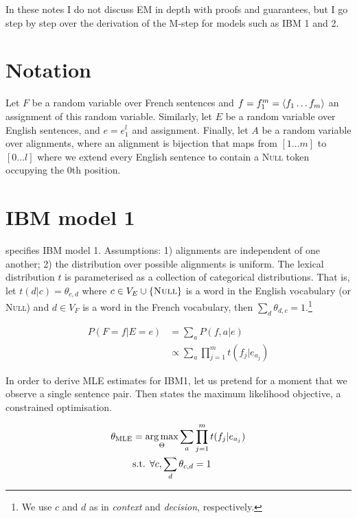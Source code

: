 In these notes I do not discuss EM in depth with proofs and guarantees, but I go step by step over the derivation of the M-step for models such as IBM 1 and 2.

\section{Notation}


Let $F$ be a random variable over French sentences and $f = f_1^m = \left\langle f_1 \ldots f_m \right\rangle$ an assignment of this random variable.
Similarly, let $E$ be a random variable over English sentences, and $e=e_1^l$ and assignment.
Finally, let $A$ be a random variable over alignments, where an alignment is bijection that maps from $[1 \ldots m]$ to $[0 \ldots l]$ where we extend every English sentence to contain a \textsc{Null} token occupying the $0$th position.


\section{IBM model 1}

 specifies IBM model 1\citep{Brown+1993:smt}.
Assumptions: 1) alignments are independent of one another; 2) the distribution over possible alignments is uniform.
The lexical distribution $t$ is parameterised as a collection of categorical distributions. That is, let $t(d|c) = \theta_{c,d}$ where $c \in V_E \cup \{\textsc{Null}\}$ is a word in the English vocabulary (or \textsc{Null}) and $d \in V_F$ is a word in the French vocabulary, then $\sum_d \theta_{d,c} = 1$.\footnote{We use $c$ and $d$ as in \emph{context} and \emph{decision}, respectively.} 

\begin{align}
P(F=f|E=e) &= 
	\sum_a P(f,a|e) \nonumber \\ 
	&\propto \sum_a \prod_{j=1}^m t(f_j|e_{a_j}) \label{eq:IBM1}
\end{align}

In order to derive MLE estimates for IBM1, let us pretend for a moment that we observe a single sentence pair.
Then  states the maximum likelihood objective, a constrained optimisation.

\begin{align}\label{eq:MLE1}
\theta_{\text{MLE}} &= \operatorname*{arg\,max}_{\Theta} \sum_a \prod_{j=1}^m t(f_j|e_{a_j}) \\
 & \text{s.t. } \forall c, \sum_d \theta_{c,d} = 1 \nonumber 
\end{align}

